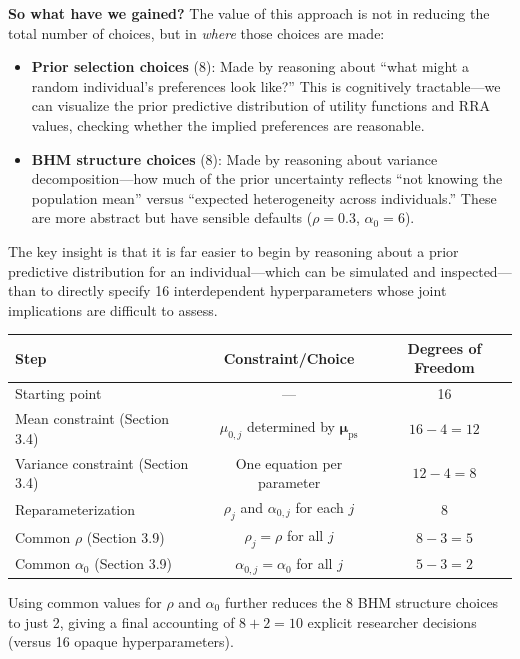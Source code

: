 \documentclass[11pt]{article}
\begin{document}
\textbf{So what have we gained?} The value of this approach is not in reducing the total number of choices, but in \textit{where} those choices are made:
\begin{itemize}
  \item \textbf{Prior selection choices} (8): Made by reasoning about ``what might a random individual's preferences look like?'' This is cognitively tractable---we can visualize the prior predictive distribution of utility functions and RRA values, checking whether the implied preferences are reasonable.
  \item \textbf{BHM structure choices} (8): Made by reasoning about variance decomposition---how much of the prior uncertainty reflects ``not knowing the population mean'' versus ``expected heterogeneity across individuals.'' These are more abstract but have sensible defaults ($\rho = 0.3$, $\alpha_0 = 6$).
\end{itemize}

The key insight is that it is far easier to begin by reasoning about a prior predictive distribution for an individual---which can be simulated and inspected---than to directly specify 16 interdependent hyperparameters whose joint implications are difficult to assess.

\begin{center}
\begin{tabular}{lcc}
\toprule
Step & Constraint/Choice & Degrees of Freedom \\
\midrule
Starting point & --- & 16 \\
Mean constraint (Section 3.4) & $\mu_{0,j}$ determined by $\boldsymbol{\mu}_{\text{ps}}$ & $16 - 4 = 12$ \\
Variance constraint (Section 3.4) & One equation per parameter & $12 - 4 = 8$ \\
\midrule
Reparameterization & $\rho_j$ and $\alpha_{0,j}$ for each $j$ & 8 \\
Common $\rho$ (Section 3.9) & $\rho_j = \rho$ for all $j$ & $8 - 3 = 5$ \\
Common $\alpha_0$ (Section 3.9) & $\alpha_{0,j} = \alpha_0$ for all $j$ & $5 - 3 = 2$ \\
\bottomrule
\end{tabular}
\end{center}

Using common values for $\rho$ and $\alpha_0$ further reduces the 8 BHM structure choices to just 2, giving a final accounting of $8 + 2 = 10$ explicit researcher decisions (versus 16 opaque hyperparameters).
\end{document}
